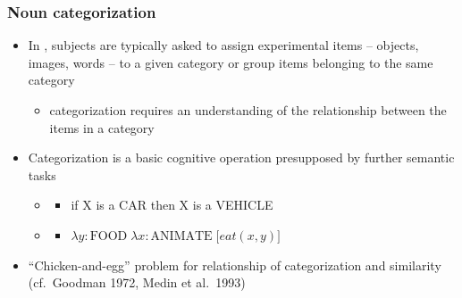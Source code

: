 \documentclass[t]{beamer} %
\begin{document}
\begin{frame}
\frametitle{Noun categorization}

\begin{itemize}
\item In , subjects are typically asked to assign experimental items -- objects, images, words -- to a given category or group items belonging to the same category
\begin{itemize}
\item categorization requires an understanding of the relationship between the items in a category
\end {itemize}
\item Categorization is a basic cognitive operation presupposed by further semantic tasks
\begin{itemize}
\item {}
\begin{itemize}
\item if X is a CAR then X is a VEHICLE
\end{itemize}
\item {}
\begin{itemize}
\item $\lambda y: \text{FOOD}\; \lambda x:\text{ANIMATE} \; \bigl[ eat(x,y) \bigr]$
\end{itemize}
\end{itemize}
\item ``Chicken-and-egg'' problem for relationship of categorization and similarity (cf.\ Goodman 1972, Medin et al.\ 1993)
\end{itemize}
\end{frame}
\end{document}
